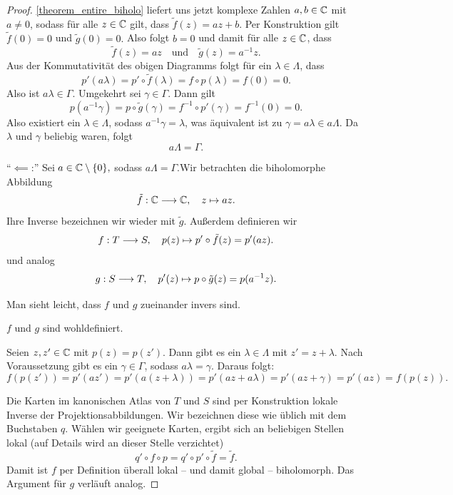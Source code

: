 \begin{proof}
	\cref{theorem_entire_biholo} liefert uns jetzt komplexe Zahlen \(a,b\in\mathbb{C}\) mit \(a\neq 0\), sodass für alle \(z\in \mathbb{C}\) gilt, dass
	\(\tilde{f}(z)=az+b.\) Per Konstruktion gilt \(\tilde{f}(0) = 0\) und \(\tilde{g}(0) = 0.\) Also folgt \(b= 0\) und damit für alle \(z \in \mathbb{C}\), dass 
	\[
		\tilde{f}(z) = az \quad \text{und} \quad  
		\tilde{g}(z) = a^{-1} z.
	\]
	Aus der Kommutativität des obigen Diagramms folgt für ein \(\lambda\in \Lambda\), dass
	\[p' (a\lambda) = p'\circ\tilde{f}(\lambda)=f\circ p (\lambda)=f(0)=0.\]
	Also ist \(a\lambda \in \Gamma.\) Umgekehrt sei \(\gamma\in\Gamma.\) Dann gilt
	\[p(a^{-1}\gamma)=p \circ \tilde{g}(\gamma)=f^{-1}\circ  p' (\gamma)=f^{-1}(0)=0.\]
	Also existiert ein \(\lambda\in \Lambda\), sodass \(a^{-1}\gamma = \lambda\), was äquivalent ist zu \(\gamma=a\lambda\in a\Lambda.\) Da \(\lambda\) und \(\gamma\) beliebig waren, folgt \[a\Lambda=\Gamma.\]  

	\enquote{\(\impliedby\):} Sei \(a \in \mathbb{C} \setminus \{0\},\) sodass \(a \Lambda = \Gamma.\)Wir betrachten die biholomorphe Abbildung 
	\[\tilde{f}:\mathbb{C}\longrightarrow\mathbb{C},\quad z\mapsto az.\]
	Ihre Inverse bezeichnen wir wieder mit \(\tilde{g}.\)
	Außerdem definieren wir \[f:T\longrightarrow S,\quad p(z)\mapsto p'\circ\tilde{f}(z)=p'(az).\]
	und analog 
	\[g:S\longrightarrow T,\quad p'(z)\mapsto p\circ\tilde{g}(z)=p(a^{-1}z).\]

	Man sieht leicht, dass $f$ und $g$ zueinander invers sind.
	\begin{claim}
		\(f\) und \(g\) sind wohldefiniert.
	\end{claim}
	\begin{proofofclaim}
		Seien \(z,z'\in\mathbb{C}\) mit \(p(z)=p(z')\). Dann  gibt es ein \(\lambda\in\Lambda\) mit \(z'= z+\lambda\). Nach Voraussetzung gibt es ein \(\gamma\in\Gamma\), sodass \(a\lambda=\gamma\). Daraus folgt:
		\[f(p(z'))=p'(az')=p'(a(z+\lambda))=p'(az+a\lambda)=p'(az + \gamma)=p'(az)=f(p(z)).\]
	\end{proofofclaim}
	
	Die Karten im kanonischen Atlas von \(T\) und \(S\) sind per Konstruktion lokale Inverse der Projektionsabbildungen. Wir bezeichnen diese wie üblich mit dem Buchstaben \(q\). Wählen wir geeignete Karten, ergibt sich an beliebigen Stellen lokal (auf Details wird an dieser Stelle verzichtet)
	\[q'\circ f\circ p=q'\circ p'\circ \tilde{f}=\tilde{f}.\]
	Damit ist \(f\) per Definition überall lokal -- und damit global -- biholomorph. Das Argument für \(g\) verläuft analog.
\end{proof}

\pagebreak
